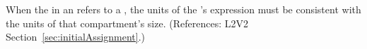 When the  in an \InitialAssignment refers to a
\Compartment, the units of the \InitialAssignment's  expression
must be consistent with the units of that compartment's size.  (References:
L2V2 Section~\ref{sec:initialAssignment}.)
